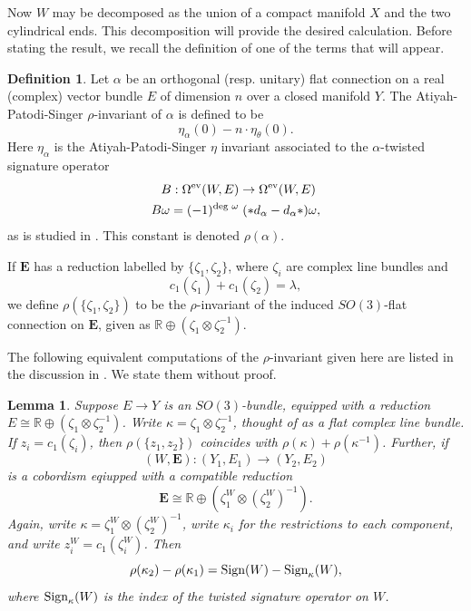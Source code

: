 \documentclass{memo-l}
\newtheorem{lemma}[theorem]{Lemma}
\theoremstyle{definition}
\newtheorem{definition}[theorem]{Definition}
\theoremstyle{remark}
\numberwithin{section}{chapter}
\numberwithin{equation}{chapter}
\begin{document}
Now $W$ may be decomposed as the union of a compact manifold $X$ and the two cylindrical ends. This decomposition will provide the desired calculation. Before stating the result, we recall the definition of one of the terms that will appear.

\begin{definition}Let $\alpha$ be an orthogonal (resp. unitary) flat connection on a real (complex) vector bundle $E$ of dimension $n$ over a closed manifold $Y$. The Atiyah-Patodi-Singer $\rho$-invariant of $\alpha$ is defined to be 
$$\eta_\alpha(0) - n \cdot \eta_\theta(0).$$ 
Here $\eta_\alpha$ is the Atiyah-Patodi-Singer $\eta$ invariant associated to the $\alpha$-twisted signature operator 
\begin{align*}
B: \Omega^{\textup{ev}}(W,E) &\to \Omega^{\textup{ev}}(W,E)\\
B\omega = (-1)^{\textup{deg } \omega}&\;(*d_\alpha - d_\alpha*)\omega,
\end{align*}
as is studied in \cite{atiyah1975spectral2}. This constant is denoted $\rho(\alpha)$.

If $\mathbf{E}$ has a reduction labelled by $\{\zeta_1, \zeta_2\}$, where $\zeta_i$ are complex line bundles and
$$c_1(\zeta_1) + c_1(\zeta_2) = \lambda,$$
we define $\rho(\{\zeta_1, \zeta_2\})$ to be the $\rho$-invariant of the induced $SO(3)$-flat connection on $\mathbf{E}$, given as $\mathbb R \oplus (\zeta_1 \otimes \zeta_2^{-1})$.
\end{definition}

The following equivalent computations of the $\rho$-invariant given here are listed in the discussion in \cite[Section~2.9]{hedden2011chern}. We state them without proof.

\begin{lemma}Suppose $E \to Y$ is an $SO(3)$-bundle, equipped with a reduction $E \cong \mathbb R \oplus (\zeta_1 \otimes \zeta_2^{-1})$. Write $\kappa = \zeta_1 \otimes \zeta_2^{-1}$, thought of as a flat complex line bundle.
If $z_i = c_1(\zeta_i)$, then $\rho(\{z_1, z_2\})$ coincides with $\rho(\kappa) + \rho(\kappa^{-1})$. Further, if 
$$(W,\mathbf{E}): (Y_1,E_1) \to (Y_2,E_2)$$ 
is a cobordism eqiupped with a compatible reduction  
$$\mathbf{E} \cong \mathbb R \oplus \left(\zeta_1^W \otimes (\zeta_2^{W})^{-1}\right).$$ 
Again, write $\kappa = \zeta_1^W \otimes (\zeta_2^W)^{-1}$, write $\kappa_i$ for the restrictions to each component, and write $z_i^W = c_1(\zeta_i^W)$. Then 
$$\rho(\kappa_2) - \rho(\kappa_1) = \textup{Sign}(W) - \textup{Sign}_\kappa(W),$$ 
where $\textup{Sign}_\kappa(W)$ is the index of the twisted signature operator on $W$.
\end{lemma}
\end{document}
